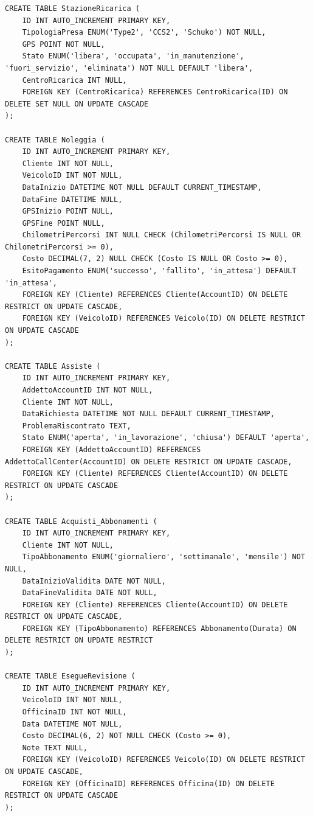 \documentclass{article}
\begin{document}
\begin{lstlisting}
CREATE TABLE StazioneRicarica (
    ID INT AUTO_INCREMENT PRIMARY KEY,
    TipologiaPresa ENUM('Type2', 'CCS2', 'Schuko') NOT NULL,
    GPS POINT NOT NULL, 
    Stato ENUM('libera', 'occupata', 'in_manutenzione', 'fuori_servizio', 'eliminata') NOT NULL DEFAULT 'libera',
    CentroRicarica INT NULL,
    FOREIGN KEY (CentroRicarica) REFERENCES CentroRicarica(ID) ON DELETE SET NULL ON UPDATE CASCADE
);

CREATE TABLE Noleggia (
    ID INT AUTO_INCREMENT PRIMARY KEY,
    Cliente INT NOT NULL,
    VeicoloID INT NOT NULL,
    DataInizio DATETIME NOT NULL DEFAULT CURRENT_TIMESTAMP,
    DataFine DATETIME NULL,
    GPSInizio POINT NULL, 
    GPSFine POINT NULL,
    ChilometriPercorsi INT NULL CHECK (ChilometriPercorsi IS NULL OR ChilometriPercorsi >= 0),
    Costo DECIMAL(7, 2) NULL CHECK (Costo IS NULL OR Costo >= 0),
    EsitoPagamento ENUM('successo', 'fallito', 'in_attesa') DEFAULT 'in_attesa',
    FOREIGN KEY (Cliente) REFERENCES Cliente(AccountID) ON DELETE RESTRICT ON UPDATE CASCADE,
    FOREIGN KEY (VeicoloID) REFERENCES Veicolo(ID) ON DELETE RESTRICT ON UPDATE CASCADE
);

CREATE TABLE Assiste (
    ID INT AUTO_INCREMENT PRIMARY KEY,
    AddettoAccountID INT NOT NULL,
    Cliente INT NOT NULL,
    DataRichiesta DATETIME NOT NULL DEFAULT CURRENT_TIMESTAMP,
    ProblemaRiscontrato TEXT,
    Stato ENUM('aperta', 'in_lavorazione', 'chiusa') DEFAULT 'aperta',
    FOREIGN KEY (AddettoAccountID) REFERENCES AddettoCallCenter(AccountID) ON DELETE RESTRICT ON UPDATE CASCADE,
    FOREIGN KEY (Cliente) REFERENCES Cliente(AccountID) ON DELETE RESTRICT ON UPDATE CASCADE
);

CREATE TABLE Acquisti_Abbonamenti (
    ID INT AUTO_INCREMENT PRIMARY KEY,
    Cliente INT NOT NULL,
    TipoAbbonamento ENUM('giornaliero', 'settimanale', 'mensile') NOT NULL,
    DataInizioValidita DATE NOT NULL,
    DataFineValidita DATE NOT NULL,
    FOREIGN KEY (Cliente) REFERENCES Cliente(AccountID) ON DELETE RESTRICT ON UPDATE CASCADE,
    FOREIGN KEY (TipoAbbonamento) REFERENCES Abbonamento(Durata) ON DELETE RESTRICT ON UPDATE RESTRICT
);

CREATE TABLE EsegueRevisione (
    ID INT AUTO_INCREMENT PRIMARY KEY,
    VeicoloID INT NOT NULL,
    OfficinaID INT NOT NULL,
    Data DATETIME NOT NULL,
    Costo DECIMAL(6, 2) NOT NULL CHECK (Costo >= 0),
    Note TEXT NULL,
    FOREIGN KEY (VeicoloID) REFERENCES Veicolo(ID) ON DELETE RESTRICT ON UPDATE CASCADE, 
    FOREIGN KEY (OfficinaID) REFERENCES Officina(ID) ON DELETE RESTRICT ON UPDATE CASCADE
);


\end{lstlisting}
\end{document}
